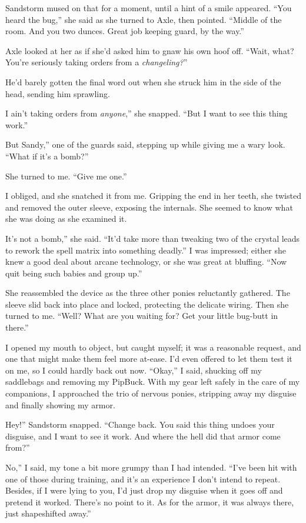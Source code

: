 Sandstorm mused on that for a moment, until a hint of a smile appeared. “You heard the bug,” she said as she turned to Axle, then pointed. “Middle of the room. And you two dunces. Great job keeping guard, by the way.”

Axle looked at her as if she’d asked him to gnaw his own hoof off. “Wait, what? You’re seriously taking orders from a \textit{changeling?}”

He’d barely gotten the final word out when she struck him in the side of the head, sending him sprawling.

\leavevmode{}I ain’t taking orders from \textit{anyone},” she snapped. “But I want to see this thing work.”

\leavevmode{}But Sandy,” one of the guards said, stepping up while giving me a wary look. “What if it’s a bomb?”

She turned to me. “Give me one.”

I obliged, and she snatched it from me. Gripping the end in her teeth, she twisted and removed the outer sleeve, exposing the internals. She seemed to know what she was doing as she examined it.

\leavevmode{}It’s not a bomb,” she said. “It’d take more than tweaking two of the crystal leads to rework the spell matrix into something deadly.” I was impressed; either she knew a good deal about arcane technology, or she was great at bluffing. “Now quit being such babies and group up.”

She reassembled the device as the three other ponies reluctantly gathered. The sleeve slid back into place and locked, protecting the delicate wiring. Then she turned to me. “Well? What are you waiting for? Get your little bug-butt in there.”

I opened my mouth to object, but caught myself; it was a reasonable request, and one that might make them feel more at-ease. I’d even offered to let them test it on me, so I could hardly back out now. “Okay,” I said, shucking off my saddlebags and removing my PipBuck.
With my gear left safely in the care of my companions, I approached the trio of nervous ponies, stripping away my disguise and finally showing my armor.

\leavevmode{}Hey!” Sandstorm snapped. “Change back. You said this thing undoes your disguise, and I want to see it work. And where the hell did that armor come from?”

\leavevmode{}No,” I said, my tone a bit more grumpy than I had intended. “I’ve been hit with one of those during training, and it’s an experience I don’t intend to repeat. Besides, if I were lying to you, I’d just drop my disguise when it goes off and pretend it worked. There’s no point to it. As for the armor, it was always there, just shapeshifted away.”

